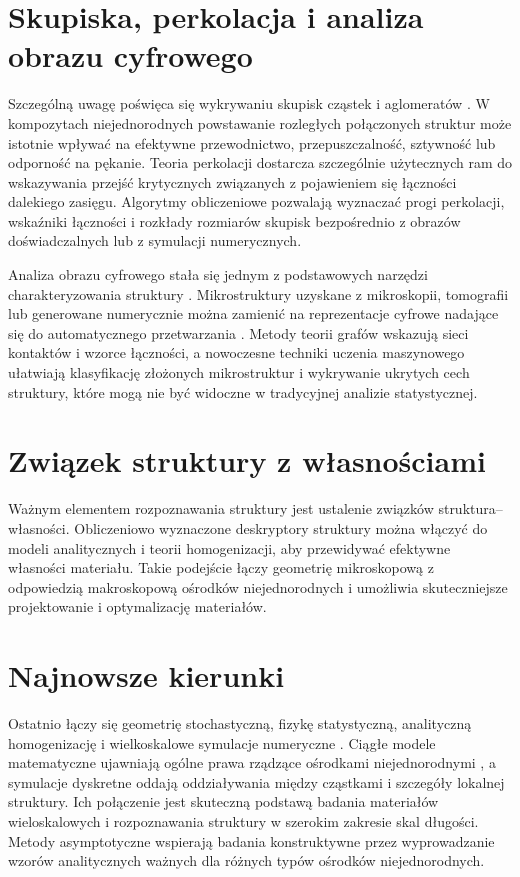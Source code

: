 \documentclass[12pt,a4paper,twoside,openright]{report}
\theoremstyle{definition}
\theoremstyle{remark}
\begin{document}
{\section{Skupiska, perkolacja i analiza obrazu cyfrowego}
Szczególną uwagę poświęca się wykrywaniu skupisk cząstek i aglomeratów \cite{rylko2022windows,mityushev2026microstructural}. W kompozytach niejednorodnych powstawanie rozległych połączonych struktur może istotnie wpływać na efektywne przewodnictwo, przepuszczalność, sztywność lub odporność na pękanie. Teoria perkolacji dostarcza szczególnie użytecznych ram do wskazywania przejść krytycznych związanych z pojawieniem się łączności dalekiego zasięgu. Algorytmy obliczeniowe pozwalają wyznaczać progi perkolacji, wskaźniki łączności i rozkłady rozmiarów skupisk bezpośrednio z obrazów doświadczalnych lub z symulacji numerycznych.

Analiza obrazu cyfrowego stała się jednym z podstawowych narzędzi charakteryzowania struktury \cite{terada1997digital}. Mikrostruktury uzyskane z mikroskopii, tomografii lub generowane numerycznie można zamienić na reprezentacje cyfrowe nadające się do automatycznego przetwarzania \cite{rylko2022windows}. Metody teorii grafów wskazują sieci kontaktów i wzorce łączności, a nowoczesne techniki uczenia maszynowego ułatwiają klasyfikację złożonych mikrostruktur i wykrywanie ukrytych cech struktury, które mogą nie być widoczne w tradycyjnej analizie statystycznej.

\section{Związek struktury z własnościami}
Ważnym elementem rozpoznawania struktury jest ustalenie związków struktura--własności. Obliczeniowo wyznaczone deskryptory struktury można włączyć do modeli analitycznych i teorii homogenizacji, aby przewidywać efektywne własności materiału. Takie podejście łączy geometrię mikroskopową z odpowiedzią makroskopową ośrodków niejednorodnych i umożliwia skuteczniejsze projektowanie i optymalizację materiałów.

\section{Najnowsze kierunki}
Ostatnio łączy się geometrię stochastyczną, fizykę statystyczną, analityczną homogenizację i wielkoskalowe symulacje numeryczne \cite{armstrong2019quantitative,telega2004stochastic,bramati2026periodic}. Ciągłe modele matematyczne ujawniają ogólne prawa rządzące ośrodkami niejednorodnymi \cite{bakhvalov2012homogenisation,jikov2012homogenization}, a symulacje dyskretne oddają oddziaływania między cząstkami i szczegóły lokalnej struktury. Ich połączenie jest skuteczną podstawą badania materiałów wieloskalowych i rozpoznawania struktury w szerokim zakresie skal długości. Metody asymptotyczne \cite{andrianov2020mathematical,andrianov2002asymptotology,andrianov2023approximate} wspierają badania konstruktywne przez wyprowadzanie wzorów analitycznych ważnych dla różnych typów ośrodków niejednorodnych.

}
\end{document}
